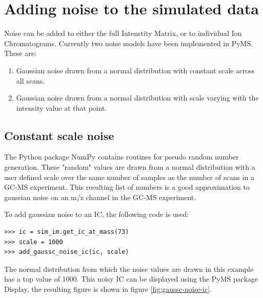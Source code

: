 \section{Adding noise to the simulated data}
Noise can be added to either the full Intenstity Matrix, or to individual
Ion Chromatograms. Currently two noise models have been implemented in PyMS. 
These are:

\begin{enumerate}
  \item Gaussian noise drawn from a normal distribution with constant scale across all scans.
  \item Gaussian noise drawn from a normal distribution with scale varying with the intensity
value at that point.
\end{enumerate}


\subsection{Constant scale noise}


The Python package NumPy contains routines for pseudo random number generation. These
"random" values are drawn from a normal distribution with a user defined scale over the same number
of samples as the number of scans in a GC-MS experiment. This resulting list of numbers is a 
good approximation to gaussian noise on an m/z channel in the GC-MS experiment. 

To add gaussian noise to an IC, the following code is used:

\begin{verbatim}
>>> ic = sim_im.get_ic_at_mass(73)
>>> scale = 1000
>>> add_gaussc_noise_ic(ic, scale)
\end{verbatim}

The normal distribution from which the noise values are drawn in this example has a top value of 1000.
This noisy IC can be displayed using the PyMS package Display, the resulting figure is shown in figure
\ref{fig:gaussc-noise-ic}.

